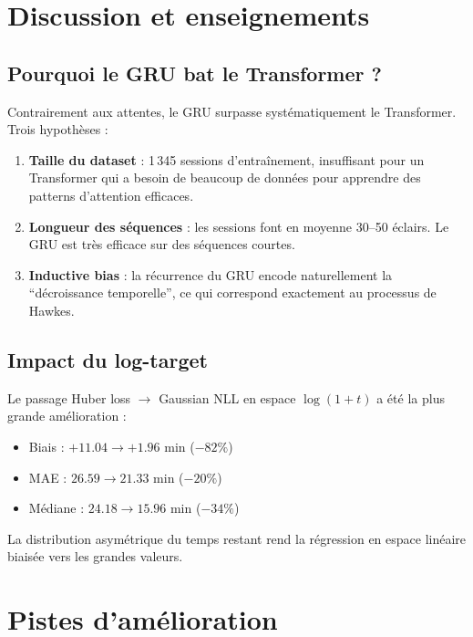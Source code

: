 \documentclass[11pt,a4paper]{article}
\begin{document}
\section{Discussion et enseignements}

\subsection{Pourquoi le GRU bat le Transformer ?}

Contrairement aux attentes, le GRU surpasse systématiquement le Transformer. Trois hypothèses :

\begin{enumerate}[nosep]
  \item \textbf{Taille du dataset} : 1\,345 sessions d'entraînement, insuffisant pour un Transformer qui a besoin de beaucoup de données pour apprendre des patterns d'attention efficaces.
  \item \textbf{Longueur des séquences} : les sessions font en moyenne 30--50 éclairs. Le GRU est très efficace sur des séquences courtes.
  \item \textbf{Inductive bias} : la récurrence du GRU encode naturellement la ``décroissance temporelle'', ce qui correspond exactement au processus de Hawkes.
\end{enumerate}

\subsection{Impact du log-target}

Le passage Huber loss $\rightarrow$ Gaussian NLL en espace $\log(1+t)$ a été la plus grande amélioration :
\begin{itemize}[nosep]
  \item Biais : $+11.04 \to +1.96$ min ($-82\%$)
  \item MAE : $26.59 \to 21.33$ min ($-20\%$)
  \item Médiane : $24.18 \to 15.96$ min ($-34\%$)
\end{itemize}

La distribution asymétrique du temps restant rend la régression en espace linéaire biaisée vers les grandes valeurs.


\section{Pistes d'amélioration}
\end{document}
